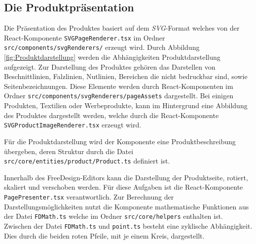 \subsection{Die Produktpräsentation}
Die Präsentation des Produktes basiert auf dem \emph{SVG}-Format welches von der React-Komponente \lstinline|SVGPageRenderer.tsx| im Ordner \lstinline|src/components/svgRenderers/| erzeugt wird. 
Durch Abbildung \ref{fig:Produktdarstellung} werden die Abhängigkeiten Produktdarstellung aufgezeigt. 
Zur Darstellung des Produktes gehören das Darstellen von Beschnittlinien, Falzlinien, Nutlinien, Bereichen die nicht bedruckbar sind, sowie Seitenbezeichnungen. 
Diese Elemente werden durch React-Komponenten im Ordner \lstinline|src/components/svgRenderers/pageAssets| dargestellt.
Bei einigen Produkten, Textilien oder Werbeprodukte, kann im Hintergrund eine Abbildung des Produktes dargestellt werden, welche durch die React-Komponente \lstinline|SVGProductImageRenderer.tsx| erzeugt wird. 

Für die Produktdarstellung wird der Komponente eine Produktbeschreibung übergeben, deren Struktur durch die Datei \lstinline|src/core/entities/product/Product.ts| definiert ist.

Innerhalb des FreeDesign-Editors kann die Darstellung der Produktseite, rotiert, skaliert und verschoben werden. Für diese Aufgaben ist die React-Komponente \lstinline|PagePresenter.tsx| verantwortlich. 
Zur Berechnung der Darstellungsmöglichkeiten nutzt die Komponente mathematische Funktionen aus der Datei \lstinline|FDMath.ts| welche im Ordner \lstinline|src/core/helpers| enthalten ist. 
Zwischen der Datei \lstinline|FDMath.ts| und \lstinline|point.ts| besteht eine zyklische Abhängigkeit. Dies durch die beiden roten Pfeile, mit je einem Kreis, dargestellt.

% 




